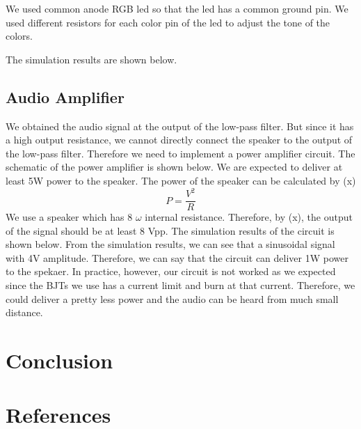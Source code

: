 \documentclass[conference]{IEEEtran}
\begin{document}
\par We used common anode RGB led so that the led has a common ground pin. We used different resistors for each color pin of the led 
to adjust the tone of the colors. \\ 

\par The simulation results are shown below.\\
\subsection{Audio Amplifier}
We obtained the audio signal at the output of the low-pass filter. But since it has a high output resistance, we cannot directly connect 
the speaker to the output of the low-pass filter. Therefore we need to implement a power amplifier circuit. The schematic of the power 
amplifier is shown below. 
We are expected to deliver at least 5W power to the speaker. The power of the speaker can be calculated by (x)
\begin{equation}
    P = \frac{V^2}{R}
\end{equation}
We use a speaker which has 8 \(\omega\) internal resistance. Therefore, by (x), the output of the signal should be at least 8 Vpp. The 
simulation results of the circuit is shown below. 
From the simulation results, we can see that a sinusoidal signal with 4V amplitude. Therefore, we can say that the circuit can deliver 
1W power to the spekaer. In practice, however, our circuit is not worked as we expected since the BJTs we use has a current limit and burn 
at that current. Therefore, we could deliver a pretty less power and the audio can be heard from much small distance. 



\section{Conclusion}

\section*{References}
\end{document}
